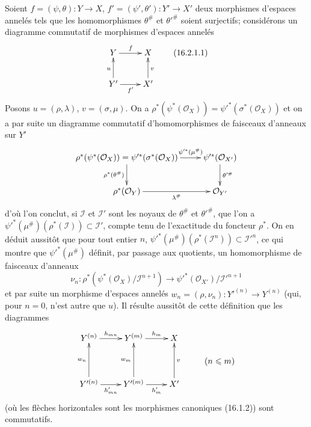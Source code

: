 \begin{env}[16.2.1]
\label{IV.16.2.1}
Soient $f=(\psi,\theta):Y\to X$,
$f'=(\psi',\theta'):Y'\to X'$ deux morphismes d'espaces annelés tels que les
homomorphismes $\theta^\#$ et $\theta'^\#$ soient surjectifs; considérons un
diagramme commutatif de morphismes d'espaces annelés
\[
  \xymatrix{
    Y \ar[r]^f & X \\
    Y' \ar[r]_{f'} \ar[u]^u & X' \ar[u]_v
  }
  \tag{16.2.1.1}
  \label{IV.16.2.1.1}
\]
Posons $u=(\rho,\lambda)$, $v=(\sigma,\mu)$. On a
$\rho^*(\psi^*(\mathcal{O}_X))=
\psi'^*(\sigma^*(\mathcal{O}_X))$ et on a par suite un diagramme commutatif
d'homomorphismes de faisceaux d'anneaux sur $Y'$
\[
  \xymatrix{
    \rho^*(\psi^*(\mathcal{O}_X))
      =\psi'^*(\sigma^*(\mathcal{O}_X))
      \ar[r]^-{\psi'^*(\mu^\#)}
      \ar[d]_{\rho^*(\theta^\#)}
      & \psi'^*(\mathcal{O}_{X'}) \ar[d]^{\theta'^\#} \\
    \rho^*(\mathcal{O}_Y) \ar[r]_-{\lambda^\#}
      & \mathcal{O}_{Y'}
  }
\]
d'où l'on conclut, si $\mathscr{I}$ et $\mathscr{I}'$ sont les noyaux de
$\theta^\#$ et $\theta'^\#$, que l'on a
$\psi'^*(\mu^\#)(\rho^*(\mathscr{I}))\subset\mathscr{I}'$, compte tenu de
l'exactitude du foncteur $\rho^*$. On en déduit aussitôt que pour tout entier
$n$,
$\psi'^*(\mu^\#)(\rho^*(\mathscr{I}^n))\subset\mathscr{I}'^n$, ce qui montre
que $\psi'^*(\mu^\#)$ définit, par passage aux quotients, un homomorphisme de
faisceaux d'anneaux
\[
  \nu_n:
  \rho^*(\psi^*(\mathcal{O}_X)/\mathscr{I}^{n+1})
  \longrightarrow
  \psi'^*(\mathcal{O}_{X'})/\mathscr{I}'^{n+1}
  \tag{16.2.1.2}
  \label{IV.16.2.1.2}
\]
et par suite un morphisme d'espaces annelés
$w_n=(\rho,\nu_n):Y'^{(n)}\to Y^{(n)}$ (qui, pour $n=0$, n'est autre que
$u$). Il résulte aussitôt de cette définition que les diagrammes
\[
  \xymatrix@R=1pc{
    Y^{(n)} \ar[r]^-{h_{mn}} & Y^{(m)} \ar[r]^-{h_m} & X \\
    & & & (n\leq m) \\
    Y'^{(n)} \ar[r]_-{h'_{mn}} \ar[uu]^-{w_n}
      & Y'^{(m)} \ar[r]_-{h'_m} \ar[uu]^-{w_m}
      & X' \ar[uu]_-v
  }
\]
(où les flèches horizontales sont les morphismes canoniques (16.1.2)) sont
commutatifs.


\end{env}
